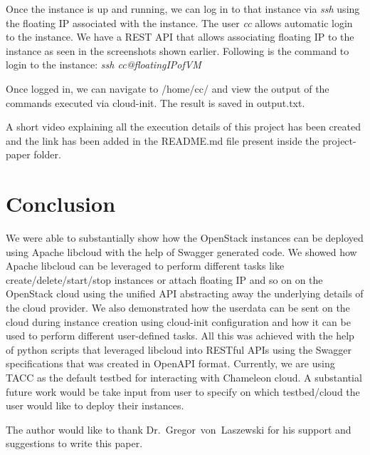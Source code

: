 Once the instance is up and running, we can log in to that instance via
\textit{ssh} using the floating IP associated with the instance. The user
\textit{cc} allows automatic login to the instance. We have a REST API that
allows associating floating IP to the instance as seen in the screenshots shown
earlier. Following is the command to login to the instance:
\textit{ssh cc@floatingIPofVM}

Once logged in, we can navigate to /home/cc/ and view the output of the 
commands executed via cloud-init. The result is saved in output.txt.

A short video explaining all the execution details of this project has been
created and the link has been added in the README.md file present inside the  
project-paper folder.

\section{Conclusion}
We were able to substantially show how the OpenStack instances can be deployed 
using Apache libcloud with the help of Swagger generated code. We showed how 
Apache libcloud can be leveraged to perform different tasks like 
create/delete/start/stop instances or attach floating IP and so on on the 
OpenStack cloud using the unified API abstracting away the underlying details 
of the cloud provider. We also demonstrated how the userdata can be sent on 
the cloud during instance creation using cloud-init configuration and how it 
can be used to perform different user-defined tasks. All this was achieved 
with the help of python scripts that leveraged libcloud into RESTful APIs 
using the Swagger specifications that was created in OpenAPI format. 
Currently, we are using TACC as the default testbed for interacting with 
Chameleon cloud. A substantial future work would be take input from user to 
specify on which testbed/cloud the user would like to deploy their instances. 

\begin{acks}

  The author would like to thank Dr.~Gregor~von~Laszewski for his
  support and suggestions to write this paper.

\end{acks}


 

